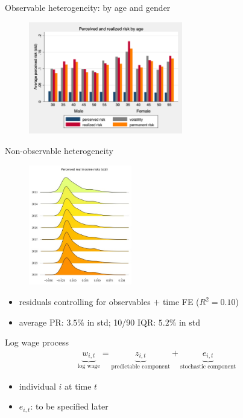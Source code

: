 \documentclass{beamer}
\begin{document}
\begin{frame}{Observable heterogeneity: by age and gender}
	\label{observable_heterogeneity_by_age}
	\begin{figure}[ht]
		\label{compare_by_gender_age}
		\centering
		\includegraphics[width=0.60\textwidth]{figures/boxplot_rvar_compare_age.png}
	\end{figure}
\end{frame}


\begin{frame}{Non-observable heterogeneity}
	\begin{figure}
		\centering
		\label{rincstd_hist}
			\includegraphics[width=0.4\textwidth]{figures/joy_rincstd.jpg}
	\end{figure}
	\begin{itemize}
		\item  residuals controlling for observables $+$ time FE ($R^2=0.10$) 
		\item average PR:  $3.5\%$ in std; 10/90 IQR: $5.2\%$ in std \quad \hyperlink{appendix:incstd}{}  
	\end{itemize}
\end{frame}


\begin{frame}{Log wage process}
	\begin{equation*}
		\begin{split}
			\underbrace{w_{i,t}}_{\text{log wage}} = \underbrace{z_{i,t}}_{\text{predictable component}}  + \underbrace{e_{i,t}}_{\text{stochastic component}}
		\end{split} 
	\end{equation*}
	
	\begin{itemize}
		\item individual \(i\) at time \(t\) 
		\item $e_{i,t}$: to be specified later
	\end{itemize}
\end{frame}
\end{document}
